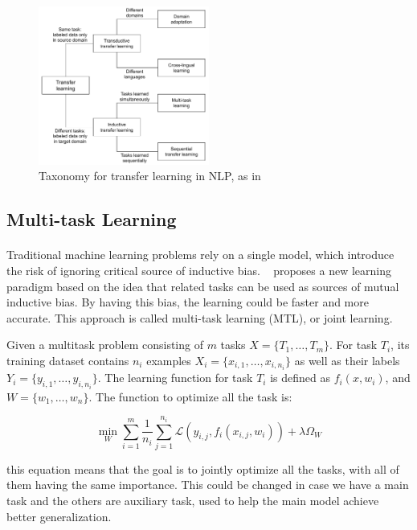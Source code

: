 \begin{figure}[]
        \centering
        \includegraphics[width=0.5\textwidth]{images/NLP_Transfer_Learning_Taxonomy.pdf}
        \caption{Taxonomy for transfer learning in NLP, as in~\citep{ruder2019neural}}
        \label{fig:nlp_transfer_taxonomy}
\end{figure}%


\subsection{Multi-task Learning}
\paragraph{}
Traditional machine learning problems rely on a single model, which introduce the risk of ignoring critical source of inductive bias. ~\cite{caruana1993mtl} proposes a new learning paradigm based on the idea that related tasks can be used as sources of mutual inductive bias. By having this bias, the learning could be faster and more accurate. This approach is called multi-task learning (MTL), or joint learning. 

Given a multitask problem consisting of $m$ tasks $X = \{T_{1}, \dots, T_{m}\}$. For task $T_i$, its training dataset contains $n_i$ examples $X_i = \{x_{i, 1}, \dots, x_{i, n_i}\}$ as well as their labels $Y_i = \{y_{i, 1}, \dots, y_{i, n_i}\}$. The learning function for task $T_i$ is defined as $f_i(x, w_i)$, and $W = \{w_1, \dots, w_n\}$. The function to optimize all the task is:

\begin{equation}
\min_{W} \sum_{i=1}^{m} \frac{1}{n_{i}} \sum_{j=1}^{n_{i}} \mathcal{L}\left(y_{i, j}, f_i(x_{i,j}, w_i)\right) + \lambda\Omega_W
\end{equation}

this equation means that the goal is to jointly optimize all the tasks, with all of them having the same importance. This could be changed in case we have a main task and the others are auxiliary task, used to help the main model achieve better generalization.

